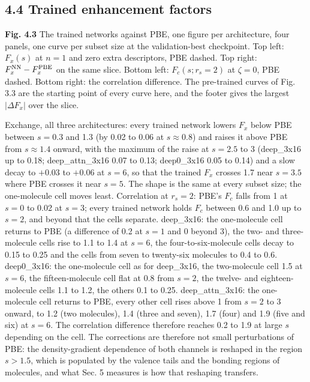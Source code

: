 \documentclass[10pt,a4paper]{article}
\begin{document}
\subsection*{4.4 Trained enhancement factors}

\textbf{Fig. 4.3} The trained networks against PBE, one figure per architecture, four panels, one curve per subset size at the validation-best checkpoint. Top left: $F_x(s)$ at $n = 1$ and zero extra descriptors, PBE dashed. Top right: $F_x^{\rm NN} - F_x^{\rm PBE}$ on the same slice. Bottom left: $F_c(s; r_s = 2)$ at $\zeta = 0$, PBE dashed. Bottom right: the correlation difference. The pre-trained curves of Fig. 3.3 are the starting point of every curve here, and the footer gives the largest $|\Delta F_x|$ over the slice.

Exchange, all three architectures: every trained network lowers $F_x$ below PBE between $s = 0.3$ and 1.3 (by 0.02 to 0.06 at $s \approx 0.8$) and raises it above PBE from $s \approx 1.4$ onward, with the maximum of the raise at $s = 2.5$ to 3 (deep\_3x16 up to 0.18; deep\_attn\_3x16 0.07 to 0.13; deep0\_3x16 0.05 to 0.14) and a slow decay to $+0.03$ to $+0.06$ at $s = 6$, so that the trained $F_x$ crosses 1.7 near $s = 3.5$ where PBE crosses it near $s = 5$. The shape is the same at every subset size; the one-molecule cell moves least. Correlation at $r_s = 2$: PBE's $F_c$ falls from 1 at $s = 0$ to 0.02 at $s = 3$; every trained network holds $F_c$ between 0.6 and 1.0 up to $s = 2$, and beyond that the cells separate. deep\_3x16: the one-molecule cell returns to PBE (a difference of 0.2 at $s = 1$ and 0 beyond 3), the two- and three-molecule cells rise to 1.1 to 1.4 at $s = 6$, the four-to-six-molecule cells decay to 0.15 to 0.25 and the cells from seven to twenty-six molecules to 0.4 to 0.6. deep0\_3x16: the one-molecule cell as for deep\_3x16, the two-molecule cell 1.5 at $s = 6$, the fifteen-molecule cell flat at 0.8 from $s = 2$, the twelve- and eighteen-molecule cells 1.1 to 1.2, the others 0.1 to 0.25. deep\_attn\_3x16: the one-molecule cell returns to PBE, every other cell rises above 1 from $s = 2$ to 3 onward, to 1.2 (two molecules), 1.4 (three and seven), 1.7 (four) and 1.9 (five and six) at $s = 6$. The correlation difference therefore reaches 0.2 to 1.9 at large $s$ depending on the cell. The corrections are therefore not small perturbations of PBE: the density-gradient dependence of both channels is reshaped in the region $s > 1.5$, which is populated by the valence tails and the bonding regions of molecules, and what Sec. 5 measures is how that reshaping transfers.
\end{document}
